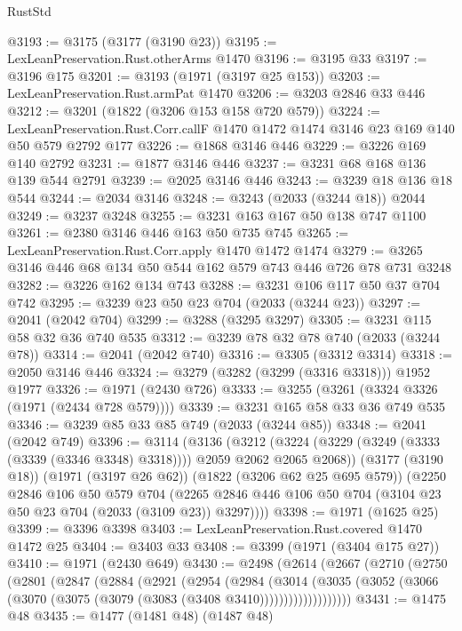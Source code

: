 \begin{lexlean}{RustStd}
\begin{coremodule}
@3193 := @3175 (@3177 (@3190 @23))
@3195 := LexLeanPreservation.Rust.otherArms @1470
@3196 := @3195 @33
@3197 := @3196 @175
@3201 := @3193 (@1971 (@3197 @25 @153))
@3203 := LexLeanPreservation.Rust.armPat @1470
@3206 := @3203 @2846 @33 @446
@3212 := @3201 (@1822 (@3206 @153 @158 @720 @579))
@3224 := LexLeanPreservation.Rust.Corr.callF
    @1470
    @1472
    @1474
    @3146
    @23
    @169
    @140
    @50
    @579
    @2792
    @177
@3226 := @1868 @3146 @446
@3229 := @3226 @169 @140 @2792
@3231 := @1877 @3146 @446
@3237 := @3231 @68 @168 @136 @139 @544 @2791
@3239 := @2025 @3146 @446
@3243 := @3239 @18 @136 @18 @544
@3244 := @2034 @3146
@3248 := @3243 (@2033 (@3244 @18)) @2044
@3249 := @3237 @3248
@3255 := @3231 @163 @167 @50 @138 @747 @1100
@3261 := @2380 @3146 @446 @163 @50 @735 @745
@3265 := LexLeanPreservation.Rust.Corr.apply @1470 @1472 @1474
@3279 := @3265 @3146 @446 @68 @134 @50 @544 @162 @579 @743 @446 @726 @78 @731 @3248
@3282 := @3226 @162 @134 @743
@3288 := @3231 @106 @117 @50 @37 @704 @742
@3295 := @3239 @23 @50 @23 @704 (@2033 (@3244 @23))
@3297 := @2041 (@2042 @704)
@3299 := @3288 (@3295 @3297)
@3305 := @3231 @115 @58 @32 @36 @740 @535
@3312 := @3239 @78 @32 @78 @740 (@2033 (@3244 @78))
@3314 := @2041 (@2042 @740)
@3316 := @3305 (@3312 @3314)
@3318 := @2050 @3146 @446
@3324 := @3279 (@3282 (@3299 (@3316 @3318))) @1952 @1977
@3326 := @1971 (@2430 @726)
@3333 := @3255 (@3261 (@3324 @3326 (@1971 (@2434 @728 @579))))
@3339 := @3231 @165 @58 @33 @36 @749 @535
@3346 := @3239 @85 @33 @85 @749 (@2033 (@3244 @85))
@3348 := @2041 (@2042 @749)
@3396 := @3114
    (@3136
      (@3212 (@3224 (@3229 (@3249 (@3333 (@3339 (@3346 @3348) @3318)))) @2059 @2062 @2065 @2068))
      (@3177 (@3190 @18))
      (@1971 (@3197 @26 @62))
      (@1822 (@3206 @62 @25 @695 @579))
      (@2250
        @2846
        @106
        @50
        @579
        @704
        (@2265 @2846 @446 @106 @50 @704 (@3104 @23 @50 @23 @704 (@2033 (@3109 @23)) @3297))))
@3398 := @1971 (@1625 @25)
@3399 := @3396 @3398
@3403 := LexLeanPreservation.Rust.covered @1470 @1472 @25
@3404 := @3403 @33
@3408 := @3399 (@1971 (@3404 @175 @27))
@3410 := @1971 (@2430 @649)
@3430 := @2498
    (@2614
      (@2667
        (@2710
          (@2750
            (@2801
              (@2847
                (@2884
                  (@2921
                    (@2954
                      (@2984
                        (@3014
                          (@3035
                            (@3052
                              (@3066 (@3070 (@3075 (@3079 (@3083 (@3408 @3410)))))))))))))))))))
@3431 := @1475 @48
@3435 := @1477 (@1481 @48) (@1487 @48)

\end{coremodule}
\end{lexlean}
